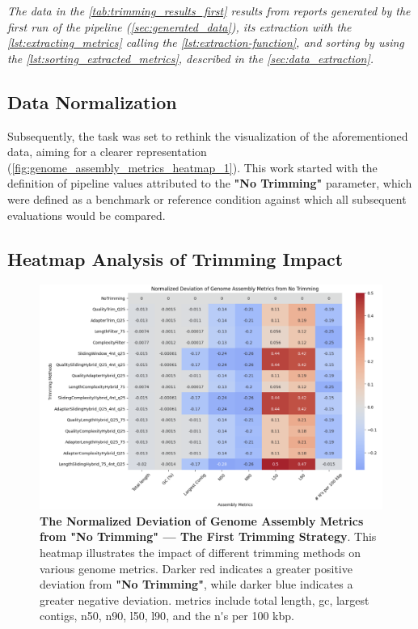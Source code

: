 \textit{The data in the \autoref{tab:trimming_results_first} results from reports generated by the first run of the pipeline (\autoref{sec:generated_data}), its extraction with the \autoref{lst:extracting_metrics} calling the \autoref{lst:extraction-function}, and sorting by using the \autoref{lst:sorting_extracted_metrics}, described in the  \autoref{sec:data_extraction}.}


\subsection{Data Normalization}

Subsequently, the task was set to rethink the visualization of the aforementioned data, aiming for a clearer representation (\autoref{fig:genome_assembly_metrics_heatmap_1}). This work started with the definition of pipeline values attributed to the \textbf{"No Trimming"} parameter, which were defined as a benchmark or reference condition against which all subsequent evaluations would be compared.

\subsection{Heatmap Analysis of Trimming Impact} 


\begin{figure}[H]
\centering
\includegraphics[width=\linewidth]{resources/images/genome_assembly_metrics_heatmap_1.png}
\caption{\textbf{The Normalized Deviation of Genome Assembly Metrics from "No Trimming" — The First Trimming Strategy}. This \gls{heatmap} illustrates the impact of different \gls{trimming} methods on various \gls{genome} \gls{metrics}. Darker red indicates a greater positive deviation from \textbf{"No Trimming"}, while darker blue indicates a greater negative deviation. \gls{metrics} include \gls{total length}, \gls{gc}, \gls{largest contigs}, \gls{n50}, \gls{n90}, \gls{l50}, \gls{l90}, and the  \gls{n's per 100 kbp}.}
\label{fig:genome_assembly_metrics_heatmap_1}
\end{figure}

